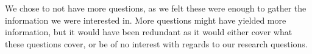 We chose to not have more questions, as we felt these were enough to gather the information we were interested in. More questions might have yielded more information, but it would have been redundant as it would either cover what these questions cover, or be of no interest with regards to our research questions.